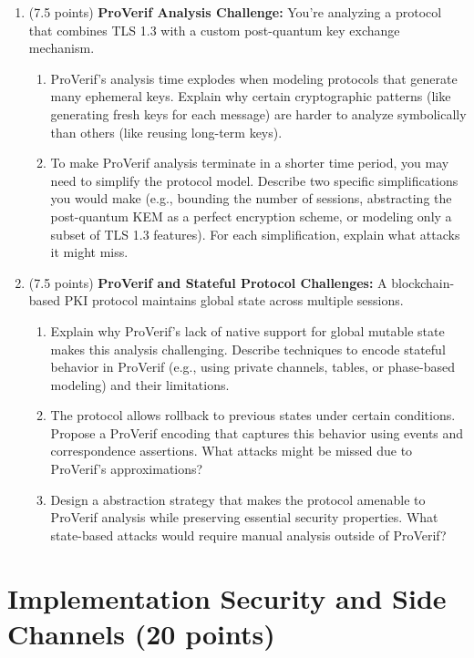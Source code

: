 \documentclass[10pt,a4paper,american]{exam}
\begin{document}
\begin{enumerate}
	\item (7.5 points) \textbf{ProVerif Analysis Challenge:}
	      You're analyzing a protocol that combines TLS 1.3 with a custom post-quantum key exchange mechanism.
	      \begin{enumerate}
		      \item ProVerif's analysis time explodes when modeling protocols that generate many ephemeral keys. Explain why certain cryptographic patterns (like generating fresh keys for each message) are harder to analyze symbolically than others (like reusing long-term keys).
		      \item To make ProVerif analysis terminate in a shorter time period, you may need to simplify the protocol model. Describe two specific simplifications you would make (e.g., bounding the number of sessions, abstracting the post-quantum KEM as a perfect encryption scheme, or modeling only a subset of TLS 1.3 features). For each simplification, explain what attacks it might miss.
	      \end{enumerate}
	\item (7.5 points) \textbf{ProVerif and Stateful Protocol Challenges:}
	      A blockchain-based PKI protocol maintains global state across multiple sessions.
	      \begin{enumerate}
		      \item Explain why ProVerif's lack of native support for global mutable state makes this analysis challenging. Describe techniques to encode stateful behavior in ProVerif (e.g., using private channels, tables, or phase-based modeling) and their limitations.
		      \item The protocol allows rollback to previous states under certain conditions. Propose a ProVerif encoding that captures this behavior using events and correspondence assertions. What attacks might be missed due to ProVerif's approximations?
		      \item Design a abstraction strategy that makes the protocol amenable to ProVerif analysis while preserving essential security properties. What state-based attacks would require manual analysis outside of ProVerif?
	      \end{enumerate}
\end{enumerate}

\section{Implementation Security and Side Channels (20 points)}
\end{document}
